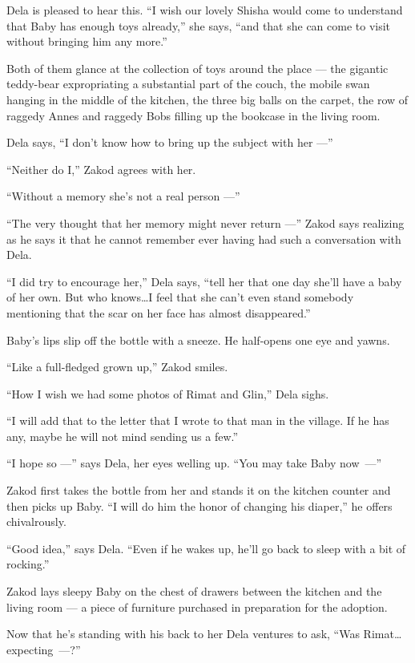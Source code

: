 \documentclass[twoside,11pt,openany]{book}
\begin{document}
Dela is pleased to hear this. ``I wish our lovely Shisha would come to understand that Baby has enough toys already,''
she says,
``and that she can come to visit without bringing him any more.''

Both of them glance at the collection of toys around the place --- the gigantic teddy-bear expropriating a substantial
part of the couch, the mobile swan hanging in the middle of the kitchen, the three big balls on the carpet, the row of
raggedy Annes and raggedy Bobs filling up the bookcase in the living room.

Dela says, ``I don't know how to bring up the subject with her ---''

``Neither do I,'' Zakod agrees with her.

``Without a memory she's not a real person ---''

``The very thought that her memory might never return ---'' Zakod says realizing as he says it
that he cannot remember ever having had such a conversation with Dela.

``I did try to encourage her,'' Dela says, ``tell her that one day she'll have a
baby of her own. But who knows{\ldots}I feel that she can't even stand somebody mentioning that the scar on her face has
almost disappeared.''

Baby's lips slip off the bottle with a sneeze. He half-opens one eye and yawns.

``Like a full-fledged grown up,'' Zakod smiles.

``How I wish we had some photos of Rimat and Glin,'' Dela sighs.

``I will add that to the letter that I wrote to that man in the village. If he has any, maybe he will not
mind sending us a few.''

``I hope so ---'' says Dela, her eyes welling up.
``You may take Baby now~---''

Zakod first takes the bottle from her and stands it on the kitchen counter and then picks up Baby. ``I
will do him the honor of changing his diaper,'' he offers chivalrously.

``Good idea,'' says Dela. ``Even if he wakes up, he'll go back to sleep with a
bit of rocking.''

Zakod lays sleepy Baby on the chest of drawers between the kitchen and the living room --- a piece of furniture purchased
in preparation for the adoption.

Now that he's standing with his back to her Dela ventures to ask, ``Was Rimat{\ldots}expecting~---?''
\end{document}
